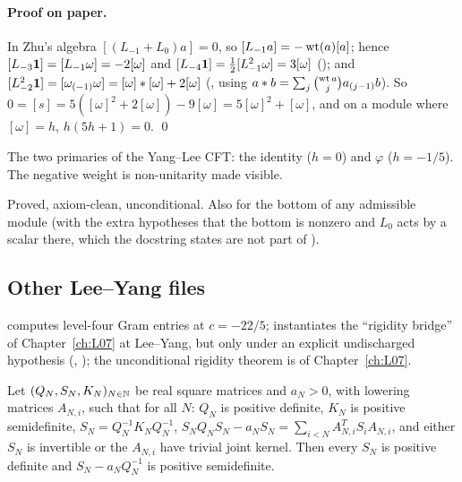 \paragraph{Proof on paper.} In Zhu's algebra $[(L_{-1}+L_0)a] = 0$, so $[L_{-1}a] = -\operatorname{wt}(a)[a]$; hence
$[L_{-3}\mathbf{1}] = [L_{-1}\omega] = -2[\omega]$ and $[L_{-4}\mathbf{1}] = \tfrac12[L_{-1}^2\omega] = 3[\omega]$
(); and $[L_{-2}^2\mathbf{1}] = [\omega_{(-1)}\omega] = [\omega]*[\omega]+2[\omega]$
(, using $a*b = \sum_j\binom{\operatorname{wt} a}{j}a_{(j-1)}b$). So
$0 = [s] = 5([\omega]^2+2[\omega]) - 9[\omega] = 5[\omega]^2+[\omega]$, and on a module where $[\omega] = h$,
$h(5h+1) = 0$. \qed

\begin{physics}
The two primaries of the Yang--Lee CFT: the identity ($h=0$) and $\varphi$ ($h = -1/5$). The negative
weight is non-unitarity made visible.
\end{physics}

\begin{status}
Proved, axiom-clean, unconditional. Also \allowbreak{}\allowbreak{}\allowbreak{}\allowbreak{}\allowbreak{}\allowbreak{} for
the bottom of any admissible module (with the extra hypotheses that the bottom is nonzero and $L_0$ acts
by a scalar there, which the docstring states are not part of ).
\end{status}

\subsection{Other Lee--Yang files}

 computes level-four Gram entries at $c=-22/5$; 
instantiates the ``rigidity bridge'' of Chapter~\ref{ch:L07} at Lee--Yang, but only under an explicit
undischarged hypothesis  (\allowbreak{}\allowbreak{}, ); the
unconditional rigidity theorem is \allowbreak{}\allowbreak{}\allowbreak{} of Chapter~\ref{ch:L07}.

\begin{theorem}\label{l19:thm:riccati}
Let $(Q_N,S_N,K_N)_{N\in{\mathbb{N}}}$ be real square matrices and $a_N>0$, with lowering matrices $A_{N,i}$, such that
for all $N$: $Q_N$ is positive definite, $K_N$ is positive semidefinite, $S_N = Q_N^{-1}K_NQ_N^{-1}$,
$S_NQ_NS_N - a_NS_N = \sum_{i<N}A_{N,i}^TS_iA_{N,i}$, and either $S_N$ is invertible or the $A_{N,i}$ have
trivial joint kernel. Then every $S_N$ is positive definite and $S_N - a_NQ_N^{-1}$ is positive semidefinite.
\end{theorem}

